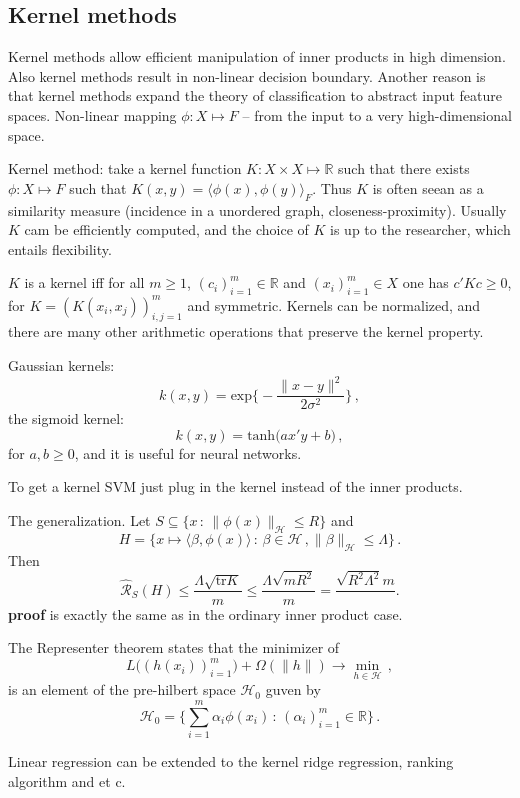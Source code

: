 \documentclass[a4paper]{article}
\newcommand{\Real}{\mathbb{R}}
\newcommand{\tr}{\text{tr}}
\newcommand{\Hcal}{\mathcal{H}}
\begin{document}
\subsection{Kernel methods} %
\label{sub:kernel_methods}

Kernel methods allow efficient manipulation of inner products in high dimension.
Also kernel methods result in non-linear decision boundary. Another reason is that
kernel methods expand the theory of classification to abstract input feature spaces.
Non-linear mapping $\phi:X\mapsto F$ -- from the input to a very high-dimensional
space.

Kernel method: take a kernel function $K:X\times X\mapsto \Real$ such that there
exists $\phi:X\mapsto F$ such that $K(x, y) = \langle \phi(x), \phi(y)\rangle_F$.
Thus $K$ is often seean as a similarity measure (incidence in a unordered graph,
closeness-proximity). Usually $K$ cam be efficiently computed, and the choice of
$K$ is up to the researcher, which entails flexibility.

$K$ is a kernel iff for all $m\geq1$, $(c_i)_{i=1}^m \in \Real$ and $(x_i)_{i=1}^m\in X$
one has $c'Kc \geq 0$, for $K = (K(x_i, x_j))_{i,j=1}^m$ and symmetric.
Kernels can be normalized, and there are many other arithmetic operations that
preserve the kernel property.

Gaussian kernels:
\[ k(x, y) = \text{exp}\biggl\{-\frac{\|x-y\|^2}{2\sigma^2}\biggr\} \,, \]
the sigmoid kernel:
\[ k(x, y) = \text{tanh}\bigl(a x'y + b \bigr) \,, \]
for $a, b\geq 0$, and it is useful for neural networks.

To get a kernel SVM just plug in the kernel instead of the inner products.

The generalization. Let $S\subseteq \{x\,:\, \|\phi(x)\|_\Hcal \leq R\}$ and
\[ H = \{x\mapsto \langle\beta, \phi(x)\rangle
    \,:\, \beta \in \Hcal\,, \|\beta\|_\Hcal \leq \Lambda\}
    \,. \]
Then
\[\hat{\mathcal{R}}_S(H)
    \leq \frac{\Lambda\sqrt{\tr K}}{m}
    \leq \frac{\Lambda\sqrt{m R^2}}{m}
    = \frac{\sqrt{R^2 \Lambda^2}{m}}
    \,. \]
\textbf{proof} is exactly the same as in the ordinary inner product case.

The Representer theorem states that the minimizer of
\[L\bigl((h(x_i))_{i=1}^m\bigr) + \Omega(\|h\|) \to \min_{h\in \Hcal}\,,\]
is an element of the pre-hilbert space $\Hcal_0$ guven by
\[ \Hcal_0 = \{\sum_{i=1}^m \alpha_i \phi(x_i)\,:\, (\alpha_i)_{i=1}^m \in \Real \} \,. \]

Linear regression can be extended to the kernel ridge regression, ranking algorithm
and et c.
\end{document}
